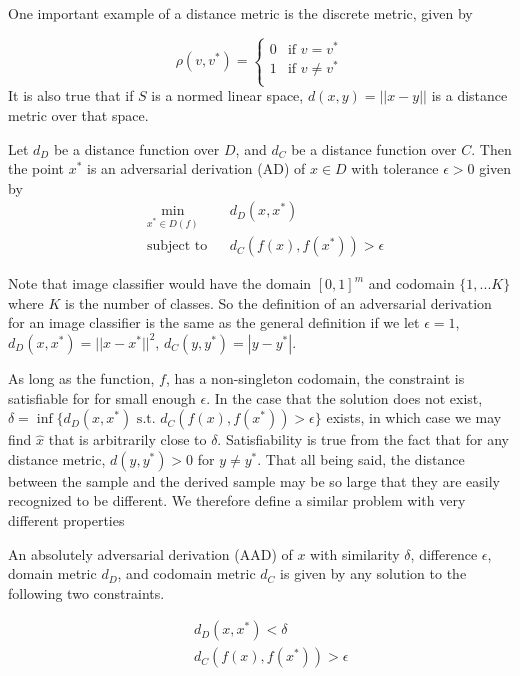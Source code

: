 \noindent One important example of a distance metric is the discrete metric, given by

\[
\rho(v,v^*) =
\begin{cases}
0 & \text{if $v = v^*$} \\
1 & \text{if $v \neq v^*$} \\
\end{cases}
\]
\noindent
It is also true that if $S$ is a normed linear space, $d(x,y) = ||x-y||$ is a distance metric over that space.

\begin{definition}
Let $d_D$ be a distance function over $D$, and $d_C$ be a distance function over $C$.  Then the point $x^*$ is an adversarial derivation (AD) of $x\in D$ with tolerance $\epsilon > 0$ given by
\begin{equation*}
\begin{aligned}
& \underset{x^*\in D(f)}{\text{min}}
& & d_D(x,x^*) \\
& \text{subject to}
& & d_C(f(x),f(x^*)) > \epsilon
\end{aligned}
\end{equation*}
\end{definition}

\noindent
Note that image classifier would have the domain $[0,1]^m$ and codomain $ \{1,...K\} $ where $K$ is the number of classes.  So the definition of an adversarial derivation for an image classifier is the same as the general definition if we let $\epsilon = 1$, $d_D(x,x^*) = ||x-x^*||^2$, $d_C(y,y^*) = |y-y^*|$.

As long as the function, $f$, has a non-singleton codomain, the constraint is satisfiable for for small enough $\epsilon$.  In the case that the solution does not exist, $\delta = \inf \{d_D(x,x^*) \text{ s.t. } d_C(f(x),f(x^*)) > \epsilon\}$ exists, in which case we may find $\hat{x}$ that is arbitrarily close to $\delta$.  Satisfiability is true from the fact that for any distance metric, $d(y,y^*) > 0$ for $y \neq y^*$.  That all being said, the distance between the sample and the derived sample may be so large that they are easily recognized to be different.  We therefore define a similar problem with very different properties

\begin{definition}
An absolutely adversarial derivation (AAD) of $x$ with similarity $\delta$, difference $\epsilon$, domain metric $d_D$, and codomain metric $d_C$ is given by any solution to the following two constraints.

\begin{equation*}
\begin{aligned}
& & d_D(x,x^*) < \delta\\
& & d_C(f(x),f(x^*)) > \epsilon
\end{aligned}
\end{equation*}
\end{definition}


